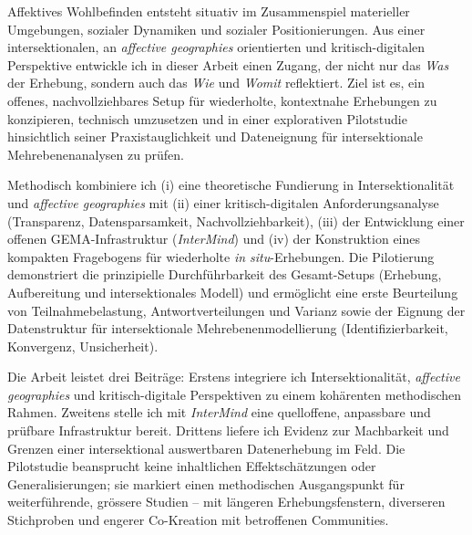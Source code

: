 Affektives Wohlbefinden entsteht situativ im Zusammenspiel materieller Umgebungen, sozialer Dynamiken und sozialer Positionierungen. Aus einer intersektionalen, an \emph{affective geographies} orientierten und kritisch-digitalen Perspektive entwickle ich in dieser Arbeit einen Zugang, der nicht nur das \emph{Was} der Erhebung, sondern auch das \emph{Wie} und \emph{Womit} reflektiert. Ziel ist es, ein offenes, nachvollziehbares Setup für wiederholte, kontextnahe Erhebungen zu konzipieren, technisch umzusetzen und in einer explorativen Pilotstudie hinsichtlich seiner Praxistauglichkeit und Dateneignung für intersektionale Mehrebenenanalysen zu prüfen.

Methodisch kombiniere ich (i) eine theoretische Fundierung in Intersektionalität und \emph{affective geographies} mit (ii) einer kritisch-digitalen Anforderungsanalyse (Transparenz, Datensparsamkeit, Nachvollziehbarkeit), (iii) der Entwicklung einer offenen GEMA-Infrastruktur (\emph{InterMind}) und (iv) der Konstruktion eines kompakten Fragebogens für wiederholte \textit{in situ}-Erhebungen. Die Pilotierung demonstriert die prinzipielle Durchführbarkeit des Gesamt-Setups (Erhebung, Aufbereitung und intersektionales Modell) und ermöglicht eine erste Beurteilung von Teilnahmebelastung, Antwortverteilungen und Varianz sowie der Eignung der Datenstruktur für intersektionale Mehrebenenmodellierung (Identifizierbarkeit, Konvergenz, Unsicherheit).

Die Arbeit leistet drei Beiträge: Erstens integriere ich Intersektionalität, \emph{affective geographies} und kritisch-digitale Perspektiven zu einem kohärenten methodischen Rahmen. Zweitens stelle ich mit \emph{InterMind} eine quelloffene, anpassbare und prüfbare Infrastruktur bereit. Drittens liefere ich Evidenz zur Machbarkeit und Grenzen einer intersektional auswertbaren Datenerhebung im Feld. Die Pilotstudie beansprucht keine inhaltlichen Effektschätzungen oder Generalisierungen; sie markiert einen methodischen Ausgangspunkt für weiterführende, grössere Studien -- mit längeren Erhebungsfenstern, diverseren Stichproben und engerer Co-Kreation mit betroffenen Communities.
